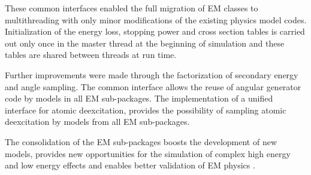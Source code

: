 These common interfaces enabled the full migration of EM classes to
multithreading \cite{embib:chep14} with only minor modifications of the existing
physics model codes.  Initialization of the energy loss, stopping power and 
cross section tables is carried out only once in the master thread at the
beginning of simulation and these tables are shared between threads at run time. 

Further improvements were made through the factorization of secondary energy and
angle sampling.  The  common interface allows
the reuse of angular generator code by models in all EM sub-packages.  The
implementation of a unified interface for atomic deexcitation, 
 provides the possibility of sampling atomic 
deexcitation by models from all EM sub-packages.
 
The consolidation of the EM sub-packages boosts the development of new models,
provides new opportunities for the simulation of complex high energy and low 
energy effects and enables better validation of EM physics \cite{embib:uni2}. 

